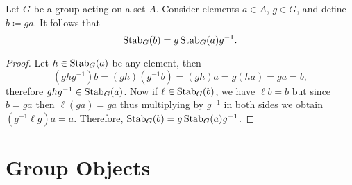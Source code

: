 \begin{theorem}
\label{thm:stabilizers-conjugation}
Let \(G\) be a group acting on a set \(A\). Consider elements \(a \in A\),
\(g \in G\), and define \(b \coloneq g a\). It follows that
\[
\operatorname{Stab}_G(b) = g \operatorname{Stab}_G(a) g^{-1}.
\]
\end{theorem}

\begin{proof}
Let \(h \in \operatorname{Stab}_G(a)\) be any element, then
\[
(g h g^{-1}) b = (g h) (g^{-1} b) = (g h) a = g (h a) = g a = b,
\]
therefore \(g h g^{-1} \in \operatorname{Stab}_G(a)\). Now if \(\ell \in \operatorname{Stab}_G(b)\), we have
\(\ell b = b\) but since \(b = g a\) then \(\ell (g a) = g a\) thus multiplying
by \(g^{-1}\) in both sides we obtain \((g^{-1} \ell g) a = a\). Therefore,
\(\operatorname{Stab}_G(b) = g \operatorname{Stab}_G(a) g^{-1}\).
\end{proof}

\section{Group Objects}

